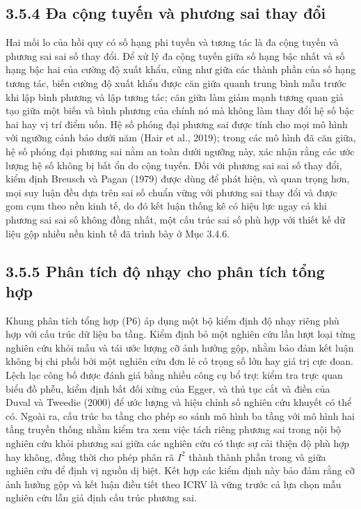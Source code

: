 \documentclass[
  a4paper,
  13pt]{extreport}
\begin{document}
\hypertarget{ux111a-cux1ed9ng-tuyux1ebfn-vuxe0-phux1b0ux1a1ng-sai-thay-ux111ux1ed5i}{%
\subsection{3.5.4 Đa cộng tuyến và phương sai thay
đổi}\label{ux111a-cux1ed9ng-tuyux1ebfn-vuxe0-phux1b0ux1a1ng-sai-thay-ux111ux1ed5i}}

Hai mối lo của hồi quy có số hạng phi tuyến và tương tác là đa cộng
tuyến và phương sai sai số thay đổi. Để xử lý đa cộng tuyến giữa số hạng
bậc nhất và số hạng bậc hai của cường độ xuất khẩu, cũng như giữa các
thành phần của số hạng tương tác, biến cường độ xuất khẩu được căn giữa
quanh trung bình mẫu trước khi lập bình phương và lập tương tác; căn
giữa làm giảm mạnh tương quan giả tạo giữa một biến và bình phương của
chính nó mà không làm thay đổi hệ số bậc hai hay vị trí điểm uốn. Hệ số
phóng đại phương sai được tính cho mọi mô hình với ngưỡng cảnh báo dưới
năm (Hair et al., 2019); trong các mô hình đã căn giữa, hệ số phóng đại
phương sai nằm an toàn dưới ngưỡng này, xác nhận rằng các ước lượng hệ
số không bị bất ổn do cộng tuyến. Đối với phương sai sai số thay đổi,
kiểm định Breusch và Pagan (1979) được dùng để phát hiện, và quan trọng
hơn, mọi suy luận đều dựa trên sai số chuẩn vững với phương sai thay đổi
và được gom cụm theo nền kinh tế, do đó kết luận thống kê có hiệu lực
ngay cả khi phương sai sai số không đồng nhất, một cấu trúc sai số phù
hợp với thiết kế dữ liệu gộp nhiều nền kinh tế đã trình bày ở Mục 3.4.6.

\hypertarget{phuxe2n-tuxedch-ux111ux1ed9-nhux1ea1y-cho-phuxe2n-tuxedch-tux1ed5ng-hux1ee3p}{%
\subsection{3.5.5 Phân tích độ nhạy cho phân tích tổng
hợp}\label{phuxe2n-tuxedch-ux111ux1ed9-nhux1ea1y-cho-phuxe2n-tuxedch-tux1ed5ng-hux1ee3p}}

Khung phân tích tổng hợp (P6) áp dụng một bộ kiểm định độ nhạy riêng phù
hợp với cấu trúc dữ liệu ba tầng. Kiểm định bỏ một nghiên cứu lần lượt
loại từng nghiên cứu khỏi mẫu và tái ước lượng cỡ ảnh hưởng gộp, nhằm
bảo đảm kết luận không bị chi phối bởi một nghiên cứu đơn lẻ có trọng số
lớn hay giá trị cực đoan. Lệch lạc công bố được đánh giá bằng nhiều công
cụ bổ trợ: kiểm tra trực quan biểu đồ phễu, kiểm định bất đối xứng của
Egger, và thủ tục cắt và điền của Duval và Tweedie (2000) để ước lượng
và hiệu chỉnh số nghiên cứu khuyết có thể có. Ngoài ra, cấu trúc ba tầng
cho phép so sánh mô hình ba tầng với mô hình hai tầng truyền thống nhằm
kiểm tra xem việc tách riêng phương sai trong nội bộ nghiên cứu khỏi
phương sai giữa các nghiên cứu có thực sự cải thiện độ phù hợp hay
không, đồng thời cho phép phân rã \(I^2\) thành thành phần trong và giữa
nghiên cứu để định vị nguồn dị biệt. Kết hợp các kiểm định này bảo đảm
rằng cỡ ảnh hưởng gộp và kết luận điều tiết theo ICRV là vững trước cả
lựa chọn mẫu nghiên cứu lẫn giả định cấu trúc phương sai.
\end{document}
